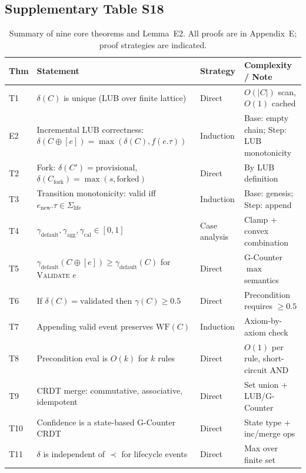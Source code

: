 \subsection{Supplementary Table S18}\label{tab:S18}
\begin{table}[htbp]
\centering
\small
\caption{Summary of nine core theorems and Lemma~E2. All proofs are in Appendix~E; proof strategies are indicated.}
\label{tab:theorems-summary}
\begin{tabularx}{\textwidth}{@{}p{1.2cm}p{3.8cm}p{2.2cm}p{4.5cm}@{}}
\toprule
\textbf{Thm} & \textbf{Statement} & \textbf{Strategy} & \textbf{Complexity / Note} \\
\midrule
T1 & $\delta(C)$ is unique (LUB over finite lattice) & Direct & $O(|C|)$ scan, $O(1)$ cached \\
E2 & Incremental LUB correctness: $\delta(C \oplus [e]) = \max(\delta(C), f(e.\tau))$ & Induction & Base: empty chain; Step: LUB monotonicity \\
T2 & Fork: $\delta(C') = \text{provisional}$, $\delta(C_{\text{fork}}) = \max(s, \text{forked})$ & Direct & By LUB definition \\
T3 & Transition monotonicity: valid iff $e_{\text{new}}.\tau \in \Sigma_{\text{life}}$ & Induction & Base: genesis; Step: append \\
T4 & $\gamma_{\text{default}}, \gamma_{\text{agg}}, \gamma_{\text{cal}} \in [0,1]$ & Case analysis & Clamp + convex combination \\
T5 & $\gamma_{\text{default}}(C \oplus [e]) \geq \gamma_{\text{default}}(C)$ for \textsc{Validate} $e$ & Direct & G-Counter $\max$ semantics \\
T6 & If $\delta(C) = \text{validated}$ then $\gamma(C) \geq 0.5$ & Direct & Precondition requires $\geq 0.5$ \\
T7 & Appending valid event preserves $\text{WF}(C)$ & Induction & Axiom-by-axiom check \\
T8 & Precondition eval is $O(k)$ for $k$ rules & Direct & $O(1)$ per rule, short-circuit AND \\
T9 & CRDT merge: commutative, associative, idempotent & Direct & Set union + LUB/G-Counter \\
T10 & Confidence is a state-based G-Counter CRDT & Direct & State type + inc/merge ops \\
T11 & $\delta$ is independent of $\prec$ for lifecycle events & Direct & Max over finite set \\
\bottomrule
\end{tabularx}
\end{table}

